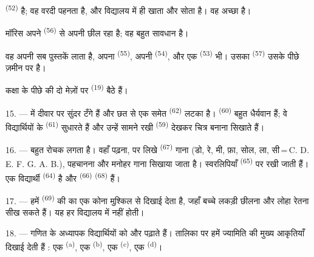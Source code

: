  \textsuperscript{(52)}  है; वह वरदी पहनता है,
और विद्यालय में ही खाता और सोता है। वह अच्छा  है।

मॉरिस अपने  \textsuperscript{(56)} से अपनी  छील रहा है;
वह बहुत सावधान है।

वह अपनी सब पुस्तकें लाता है, अपना  \textsuperscript{(55)}, अपनी
 \textsuperscript{(54)}, और एक 
\textsuperscript{(53)} भी। उसका  \textsuperscript{(57)} उसके पीछे ज़मीन पर
है।

कक्षा के पीछे की दो मेज़ों पर  \textsuperscript{(19)} बैठे
हैं।

\VUsaut{4.6mm}
\VUsaut{3.4mm}

15. ---  में दीवार पर सुंदर  टँगे हैं और
छत से एक  समेत  \textsuperscript{(62)} लटका है।
 \textsuperscript{(60)} बहुत धैर्यवान हैं; वे विद्यार्थियों के
 \textsuperscript{(61)} सुधारते हैं और उन्हें सामने रखी
 \textsuperscript{(59)} देखकर चित्र बनाना सिखाते हैं।

16. ---  बहुत रोचक लगता है। वहाँ  पढ़ना,
 पर लिखे  \textsuperscript{(67)} गाना (डो, रे, मी,
फ़ा, सोल, ला, सी\,=\,C. D. E. F. G. A. B.),  पहचानना और
मनोहर  गाना सिखाया जाता है। स्वरलिपियाँ 
\textsuperscript{(65)} पर रखी जाती हैं। एक विद्यार्थी 
\textsuperscript{(64)} है और  \textsuperscript{(66)}
 \textsuperscript{(68)} हैं।

17. --- हमें  \textsuperscript{(69)} की  का एक
कोना मुश्किल से दिखाई देता है, जहाँ बच्चे लकड़ी छीलना और लोहा रेतना सीख सकते
हैं। यह हर विद्यालय में नहीं होती।

\VUsaut{5.0mm}
\VUsaut{3.6mm}

18. --- गणित के अध्यापक विद्यार्थियों को  और
 पढ़ाते हैं। तालिका पर हमें ज्यामिति की मुख्य आकृतियाँ
दिखाई देती हैं : एक  \textsuperscript{(a)}, एक 
\textsuperscript{(b)}, एक  \textsuperscript{(c)}, एक 
\textsuperscript{(d)}।

